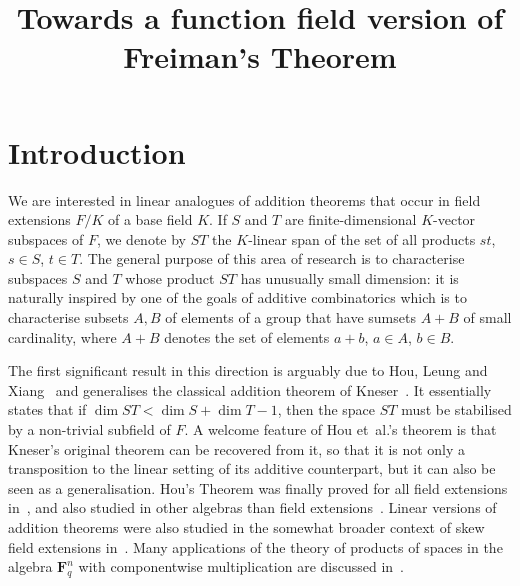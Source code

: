 \documentclass[ALCO,Unicode,ThmDefs]{cedram}
\title{Towards a function field version of Freiman's Theorem}
\author{\firstname{Christine} \lastname{Bachoc}}
\author{\firstname{Alain} \lastname{Couvreur}}
\author{\firstname{Gilles} \lastname{Zémor}}
\newcommand{\F}{\mathbf{F}}
\begin{document}
\maketitle

\section{Introduction}

We are interested in linear analogues of addition theorems that occur in field extensions $F/K$ of a base field $K$. If $S$ and $T$ are finite-dimensional $K$-vector subspaces of $F$, we denote by $ST$ the $K$-linear span of the set of all products $st$, $s\in S$, $t\in T$. The general purpose of this area of research is to characterise subspaces $S$ and $T$ whose product $ST$ has unusually small dimension: it is naturally inspired by one of the goals of additive combinatorics which is to characterise subsets $A,B$ of elements of a group that have sumsets $A+B$ of small cardinality, where $A+B$ denotes the set of elements $a+b$, $a\in A$, $b\in B$.

The first significant result in this direction is arguably due to Hou, Leung and Xiang~\cite{hlx02} and generalises the classical addition theorem of Kneser~\cite{kneser}. It essentially states that if $\dim ST < \dim S + \dim T -1$, then the space $ST$ must be stabilised by a non-trivial subfield of $F$. A welcome feature of Hou et~al.'s theorem is that Kneser's original theorem can be recovered from it, so that it is not only a transposition to the linear setting of its additive counterpart, but it can also be seen as a generalisation. Hou's Theorem was finally proved for all field extensions in~\cite{bszKneser}, and also studied in other algebras than field extensions~\cite{bl15,mz15}. Linear versions of addition theorems were also studied in the somewhat broader context of skew field extensions in~\cite{el09}. Many applications of the theory of products of spaces in the algebra $\F_q^n$ with componentwise multiplication are discussed in~\cite{hugues}.
\end{document}
